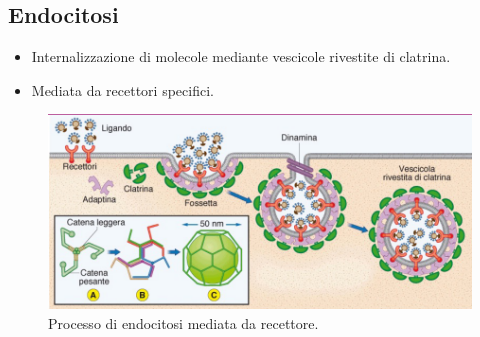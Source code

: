 \documentclass{article}
\begin{document}
\subsection{Endocitosi}
\begin{itemize}
    \item Internalizzazione di molecole mediante vescicole rivestite di clatrina.
    \item Mediata da recettori specifici.
\end{itemize}

\begin{figure}[h]
    \centering
    \includegraphics[width=1\textwidth]{Neuroscienze 2024-2025/Modulo I/Immagini Modulo I/Screenshot 2025-06-21 at 17-13-17 4. Gradiente elettrochimico_Diffusione facilitata_trasporti.pdf.png}
    \caption{Processo di endocitosi mediata da recettore.}
    \label{fig:endocitosi}
\end{figure}
\end{document}
